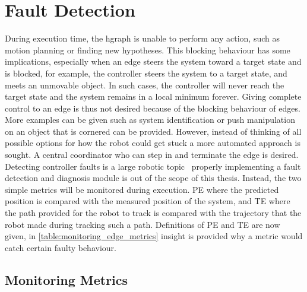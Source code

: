 \section{Fault Detection}%
\label{sec:fault_detection}
During execution time, the \ac{hgraph} is unable to perform any action, such as motion planning or finding new hypotheses. This blocking behaviour has some implications, especially when an edge steers the system toward a target state and is blocked, for example, the controller steers the system to a target state, and meets an unmovable object. In such cases, the controller will never reach the target state and the system remains in a local minimum forever. Giving complete control to an edge is thus not desired because of the blocking behaviour of edges. More examples can be given such as system identification or push manipulation on an object that is cornered can be provided. However, instead of thinking of all possible options for how the robot could get stuck a more automated approach is sought.  A central coordinator who can step in and terminate the edge is desired. Detecting controller faults is a large robotic topic~\cite{khalastchi_fault_2019} properly implementing a fault detection and diagnosis module is out of the scope of this thesis. Instead, the two simple metrics will be monitored during execution. \ac{PE} where the predicted position is compared with the measured position of the system, and \ac{TE} where the path provided for the robot to track is compared with the trajectory that the robot made during tracking such a path. Definitions of \ac{PE} and \ac{TE} are now given, in \cref{table:monitoring_edge_metrics} insight is provided why a metric would catch certain faulty behaviour.


\subsection{Monitoring Metrics}


